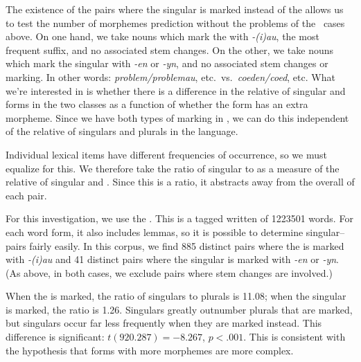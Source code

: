 \documentclass[output=paper,
modfonts
]{LSP/langsci}
\begin{document}

The existence of the pairs where the singular is marked instead of the  allows us to test the number of morphemes prediction without the problems of the \e\ cases above. On one hand, we take nouns which mark the  with \emph{-(i)au}, the most frequent  suffix, and no associated stem changes. On the other, we take nouns which mark the singular with \emph{-en} or \emph{-yn}, and no associated stem changes or  marking. In other words: \emph{problem/problemau}, etc.\ vs.\ \emph{coeden/coed}, etc. What we're interested in is whether there is a difference in the relative  of singular and  forms in the two classes as a function of whether the form has an extra morpheme. Since we have both types of marking in \w, we can do this independent of the relative  of singulars and plurals in the language.

Individual lexical items have different frequencies of occurrence, so we must equalize for this. We therefore take the ratio of singular to  as a measure of the relative  of singular and . Since this is a ratio, it abstracts away from the overall  of each pair.

For this investigation, we use the  \citep{ellisetal}. This is a tagged written  of 1223501 words. For each word form, it also includes lemmas, so it is possible to determine singular-- pairs fairly easily. In this corpus, we find 885 distinct pairs where the  is marked with \emph{-(i)au} and 41 distinct pairs where the singular is marked with \emph{-en} or \emph{-yn}. (As above, in both cases, we exclude pairs where stem changes are involved.)

When the  is marked, the ratio of singulars to plurals is 11.08; when the singular is marked, the ratio is 1.26. Singulars greatly outnumber plurals that are marked, but singulars occur far less frequently when they are marked instead. This difference is significant: $t(920.287) = -8.267$, $p < .001$. This is consistent with the hypothesis that forms with more morphemes are more complex.
\end{document}
